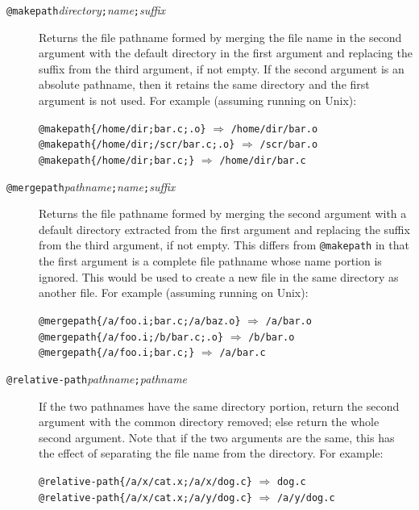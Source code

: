 \begin{description}
\item[{\tt @makepath\ttlb}{\it directory}{\tt ;}{\it name}{\tt ;}{\it suffix}{\tt \ttrb}]
Returns the file pathname formed by merging the file name in the second
argument with the
default directory in the first argument and replacing the suffix from
the third argument, if not empty.  If the second argument is an absolute
pathname, then it retains the same directory and the first argument is
not used.
For example (assuming running on Unix):
\begin{flushleft}
   \verb|@makepath{/home/dir;bar.c;.o}|  $\Rightarrow$ \verb|/home/dir/bar.o|\\
   \verb|@makepath{/home/dir;/scr/bar.c;.o}|  $\Rightarrow$ \verb|/scr/bar.o|\\
   \verb|@makepath{/home/dir;bar.c;}|  $\Rightarrow$ \verb|/home/dir/bar.c|
\end{flushleft}

\item[{\tt @mergepath\ttlb}{\it pathname}{\tt ;}{\it name}{\tt ;}{\it suffix}{\tt \ttrb}]
Returns the file pathname formed by merging the second argument with a
default directory extracted from the first argument and replacing the
suffix from the third argument, if not empty.  This differs from
\verb/@makepath/ in that the first argument is a complete file pathname
whose name portion is ignored.  This would be used to create a new file
in the same directory as another file.
For example (assuming running on Unix):
\begin{flushleft}
   \verb|@mergepath{/a/foo.i;bar.c;/a/baz.o}|  $\Rightarrow$ \verb|/a/bar.o|\\
   \verb|@mergepath{/a/foo.i;/b/bar.c;.o}|  $\Rightarrow$ \verb|/b/bar.o|\\
   \verb|@mergepath{/a/foo.i;bar.c;}|  $\Rightarrow$ \verb|/a/bar.c|
\end{flushleft}

\item[{\tt @relative-path\ttlb}{\it pathname}{\tt ;}{\it pathname}{\tt \ttrb}]
If the two pathnames have the same directory portion, return the second
argument with the common directory removed; else return the whole second
argument.  Note that if the two arguments are the same, this has the
effect of separating the file name from the directory.
For example:
\begin{flushleft}
  \verb|@relative-path{/a/x/cat.x;/a/x/dog.c}| $\Rightarrow$ \verb|dog.c|\\
  \verb|@relative-path{/a/x/cat.x;/a/y/dog.c}| $\Rightarrow$ \verb|/a/y/dog.c|
\end{flushleft}
\end{description}

